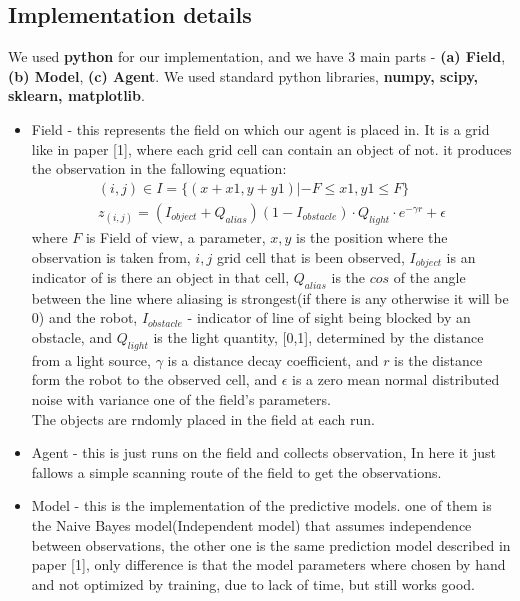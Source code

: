 \documentclass{article}
\begin{document}
	\subsection{Implementation details}
	We used \textbf{python} for our implementation, and we have 3 main parts - \textbf{(a) Field}, \textbf{(b) Model}, \textbf{(c) Agent}.
	We used standard python libraries, \textbf{numpy, scipy, sklearn, matplotlib}.     
	\begin{itemize}
		\item Field - this represents the field on which our agent is placed in. It is a grid like in paper [1], where each grid cell can contain an object of not. it produces the observation in the fallowing equation:
		\begin{align*}
		(i,j)\in I = \{(x+x1,y+y1)|-F \leq x1,y1 \leq F\} \\
		z_{(i,j)} = (I_{object} + Q_{alias})(1 - I_{obstacle}) \cdot Q_{light} \cdot e^{- \gamma r} + \epsilon 
		\end{align*}
		where $F$ is Field of view, a parameter, $x,y$ is the position where the observation is taken from, $i,j$ grid cell that is been observed, $I_{object}$ is an indicator of is there an object in that cell,
		$Q_{alias}$ is the $cos$ of the angle between the line where aliasing is strongest(if there is any otherwise it will be 0) and the robot, $I_{obstacle}$ - indicator of line of sight being blocked by an obstacle, and $Q_{light}$ is the light quantity, [0,1], determined by the distance from a light source,
		$\gamma$ is a distance decay coefficient, and $r$ is the distance form the robot to the observed cell,
		and $\epsilon$ is a zero mean normal distributed noise with variance one of the field's parameters. \\
		The objects are rndomly placed in the field at each run.
		
		\item Agent - this is just runs on the field and collects observation, In here it just fallows a simple scanning route of the field to get the observations.
		
		\item Model - this is the implementation of the predictive models. one of them is the Naive Bayes model(Independent model) that assumes independence between observations, the other one is the same prediction model described in paper [1], only difference is that the model parameters where chosen by hand and not optimized by training, due to lack of time, but still works good. 
	\end{itemize}
\end{document}
